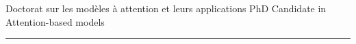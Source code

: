 \begin{minipage}{0.35\textwidth}
\end{minipage}
\begin{minipage}{0.65\textwidth}
   \vspace{2mm}
  \sc \montserratthin

  \ifFrench
    Doctorat sur les modèles à attention et leurs applications
  \else
    PhD Candidate in Attention-based models
  \fi
\end{minipage}
\commonvspace
\hrule